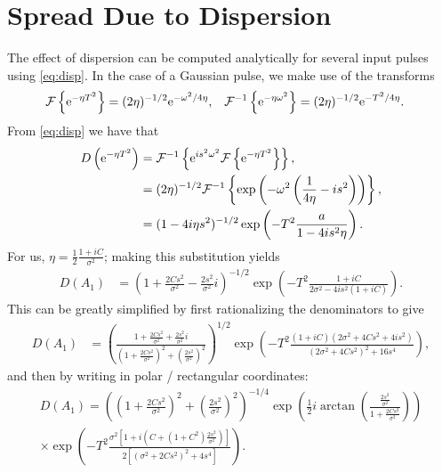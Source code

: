 
\chapter{Spread Due to Dispersion}
\label{chap:disp}

The effect of dispersion can be computed analytically for several input pulses using \eqref{eq:disp}. In the case of a Gaussian pulse, we make use of the transforms \cite{debnath, gradshteyn}
\begin{align*}
\mathcal{F}\left\{ \textrm{e}^{-\eta T^2} \right\} &= (2 \eta)^{-1/2}\textrm{e}^{-\omega^2/4\eta},& \mathcal{F}^{-1}\left\{ \textrm{e}^{-\eta \omega^2} \right\} &= (2 \eta)^{-1/2}\textrm{e}^{-T^2/4\eta}.
\end{align*}
From \eqref{eq:disp} we have that
\begin{align*}
D \left( \textrm{e}^{-\eta T^2} \right) &=\mathcal{F}^{-1}\left\{ \textrm{e}^{i s^2 \omega^2} \mathcal{F}\left\{ \textrm{e}^{-\eta T^2} \right\} \right\}, \\
&= (2 \eta)^{-1/2} \mathcal{F}^{-1}\left\{ \exp \left( -\omega^2 \left( \frac{1}{4\eta} - i s^2 \right) \right) \right\}, \\
&= (1 - 4 i \eta s^2)^{-1/2} \exp \left( -T^2 \frac{a}{1 - 4 i s^2 \eta} \right).
\end{align*}
For us, $\displaystyle \eta = \frac{1}{2} \frac{1 + i C}{\sigma^2}$; making this substitution yields
\begin{align*}
D(A_1) &= \left( 1 + \frac{2C s^2}{\sigma^2} - \frac{2s^2}{\sigma^2}i \right)^{-1/2} \exp \left( -T^2 \frac{1 + i C}{2\sigma^2 - 4 i s^2 (1 + i C)} \right).
\end{align*}
This can be greatly simplified by first rationalizing the denominators to give
\begin{align*}
D(A_1) &= \left( \frac{1 + \frac{2C s^2}{\sigma^2} + \frac{2s^2}{\sigma^2}i}{\left( 1 + \frac{2C s^2}{\sigma^2} \right)^2 + \left( \frac{2s^2}{\sigma^2} \right)^2} \right)^{1/2} \exp \left( -T^2 \frac{(1 + i C)(2\sigma^2 + 4 C s^2 + 4 i s^2)}{(2\sigma^2 + 4C s^2)^2 + 16s^4} \right),
\end{align*}
and then by writing in polar / rectangular coordinates:
\begin{multline*}
D(A_1) = \left( \left( 1 + \frac{2C s^2}{\sigma^2} \right)^2 + \left( \frac{2s^2}{\sigma^2} \right)^2 \right)^{-1/4} \exp \left( \frac{1}{2} i \arctan \left( \frac{\frac{2s^2}{\sigma^2}}{1 + \frac{2C s^2}{\sigma^2}} \right) \right) \\
\times \exp \left( -T^2 \frac{\sigma^2 \left[ 1 + i \left( C + (1 + C^2) \frac{2s^2}{\sigma^2} \right) \right]}{2 \left[ (\sigma^2 + 2C s^2)^2 + 4s^4 \right]} \right).
\end{multline*}
